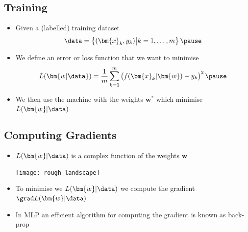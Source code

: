 \begin{slide}
\section{Training}

\begin{PauseHighLight}

\begin{itemize}
\item Given a (labelled) training dataset
  \begin{displaymath}
    \data = \left\{\strut (\bm{x}_k, y_k) \big| k=1,\ldots, m \right\} \pause
  \end{displaymath}
\item We define an error or loss function that we want to minimise
  \begin{displaymath}
    L(\bm{w|\data}) = \frac{1}{m} \sum_{k=1}^m \left( \strut
    f(\bm{x}_k|\bm{w}) - y_k \right)^2\pause
  \end{displaymath}
\item We then use the machine with the weights $\bm{w}^*$ which minimise
  $L(\bm{w}|\data)$\pause
\end{itemize}

\end{PauseHighLight}
\end{slide}


\begin{slide}
\section[-1]{Computing Gradients}

\begin{PauseHighLight}

\begin{itemize}
\item $L(\bm{w}|\data)$ is a complex function of the weights $\bm{w}$
  \begin{center}
    \texttt{[image: rough\_landscape]}\pause
  \end{center}
\item To minimise we $L(\bm{w}|\data)$ we compute the gradient $\grad
  L(\bm{w}|\data)$\pause 
\item In MLP an efficient algorithm for computing the gradient is known as
  back-prop\pause
\end{itemize}

\end{PauseHighLight}
\end{slide}


